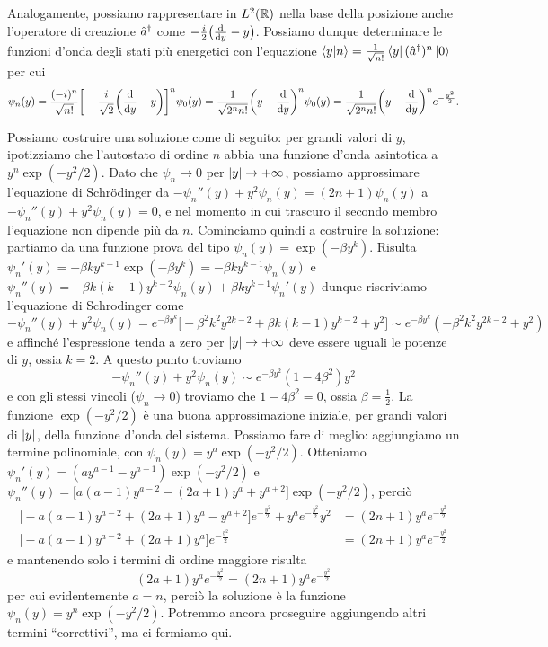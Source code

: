Analogamente, possiamo rappresentare in $L^2(\mathbb{R})$ nella base della posizione anche l'operatore di creazione ${\hat{a}}^\dagger$ come $-\frac{i}2\big(\frac{\textup{d} {}}{\textup{d} {y}}-y\big)$.
Possiamo dunque determinare le funzioni d'onda degli stati più energetici con l'equazione $\left\langle{y}\middle|{n}\right\rangle=\frac1{\sqrt{n!}}\left\langle{y}\right|({\hat{a}}^\dagger)^n\left|{0}\right\rangle$ per cui
\begin{equation}
	\psi_n(y)=\frac{(-i)^n}{\sqrt{n!}}\bigg[-\frac{i}{\sqrt{2}}\bigg(\frac{\textup{d} {}}{\textup{d} {y}}-y\bigg)\bigg]^n\psi_0(y)=\frac1{\sqrt{2^nn!}}\bigg(y-\frac{\textup{d} {}}{\textup{d} {y}}\bigg)^n\psi_0(y)=\frac1{\sqrt{2^nn!}}\bigg(y-\frac{\textup{d} {}}{\textup{d} {y}}\bigg)^ne^{-\frac{y^2}2}.
\end{equation}

Possiamo costruire una soluzione come di seguito: per grandi valori di $y$, ipotizziamo che l'autostato di ordine $n$ abbia una funzione d'onda asintotica a $y^n\exp(-y^2/2)$.
Dato che $\psi_n\to 0$ per $\left|{y}\right|\to+\infty$, possiamo approssimare l'equazione di Schr\"odinger da $-\psi_n''(y)+y^2\psi_n(y)=(2n+1)\psi_n(y)$ a $-\psi_n''(y)+y^2\psi_n(y)=0$, e nel momento in cui trascuro il secondo membro l'equazione non dipende più da $n$.
Cominciamo quindi a costruire la soluzione: partiamo da una funzione prova del tipo $\psi_n(y)=\exp(-\beta y^k)$.
Risulta $\psi_n'(y)=-\beta ky^{k-1}\exp(-\beta y^k)=-\beta ky^{k-1}\psi_n(y)$ e $\psi_n''(y)=-\beta k(k-1)y^{k-2}\psi_n(y)+\beta ky^{k-1}\psi_n'(y)$ dunque riscriviamo l'equazione di Schrodinger come
\begin{equation}
	-\psi_n''(y)+y^2\psi_n(y)=e^{-\beta y^k}\big[-\beta^2k^2y^{2k-2}+\beta k(k-1)y^{k-2}+y^2\big]\sim e^{-\beta y^k}(-\beta^2k^2y^{2k-2}+y^2)
\end{equation}
e affinch\'e l'espressione tenda a zero per $\left|{y}\right|\to+\infty$ deve essere uguali le potenze di $y$, ossia $k=2$.
A questo punto troviamo
\begin{equation}
	-\psi_n''(y)+y^2\psi_n(y)\sim e^{-\beta y^2}(1-4\beta^2)y^2
\end{equation}
e con gli stessi vincoli ($\psi_n\to 0$) troviamo che $1-4\beta^2=0$, ossia $\beta=\frac12$.
La funzione $\exp(-y^2/2)$ è una buona approssimazione iniziale, per grandi valori di $\left|{y}\right|$, della funzione d'onda del sistema.
Possiamo fare di meglio: aggiungiamo un termine polinomiale, con $\psi_n(y)=y^a\exp(-y^2/2)$.
Otteniamo $\psi_n'(y)=(ay^{a-1}-y^{a+1})\exp(-y^2/2)$ e $\psi_n''(y)=\big[a(a-1)y^{a-2}-(2a+1)y^a+y^{a+2}\big]\exp(-y^2/2)$, perciò
\begin{equation}
	\begin{aligned}
		\big[-a(a-1)y^{a-2}+(2a+1)y^a-y^{a+2}\big]e^{-\frac{y^2}2}+y^ae^{-\frac{y^2}2}y^2&=(2n+1)y^ae^{-\frac{y^2}2}\\
		\big[-a(a-1)y^{a-2}+(2a+1)y^a\big]e^{-\frac{y^2}2}&=(2n+1)y^ae^{-\frac{y^2}2}
	\end{aligned}
\end{equation}
e mantenendo solo i termini di ordine maggiore risulta
\begin{equation}
	(2a+1)y^ae^{-\frac{y^2}2}=(2n+1)y^ae^{-\frac{y^2}2}
\end{equation}
per cui evidentemente $a=n$, perciò la soluzione è la funzione $\psi_n(y)=y^n\exp(-y^2/2)$.
Potremmo ancora proseguire aggiungendo altri termini ``correttivi'', ma ci fermiamo qui.


